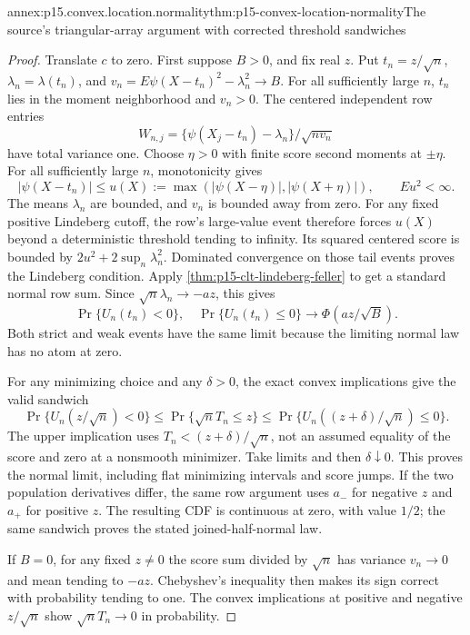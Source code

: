 \begin{annexitem}{annex:p15.convex.location.normality}{thm:p15-convex-location-normality}{The source's triangular-array argument with corrected threshold sandwiches}
\begin{proof}
Translate \(c\) to zero. First suppose \(B>0\), and fix real \(z\).
Put \(t_n=z/\sqrt n\),
\(\lambda_n=\lambda(t_n)\), and
\(v_n=E\psi(X-t_n)^2-\lambda_n^2\to B\).
For all sufficiently large \(n\), \(t_n\) lies in the moment
neighborhood and \(v_n>0\). The centered independent row entries
\[
 W_{n,j}=\{\psi(X_j-t_n)-\lambda_n\}/\sqrt{nv_n}
\]
have total variance one.
Choose \(\eta>0\) with finite score second moments at \(\pm\eta\).
For all sufficiently large \(n\), monotonicity gives
\[
 |\psi(X-t_n)|\leq
 u(X):=\max(|\psi(X-\eta)|,|\psi(X+\eta)|),\qquad Eu^2<\infty.
\]
The means \(\lambda_n\) are bounded, and \(v_n\) is bounded away
from zero. For any fixed positive Lindeberg cutoff, the row's
large-value event therefore forces \(u(X)\) beyond a deterministic
threshold tending to infinity. Its squared centered score is bounded
by \(2u^2+2\sup_n\lambda_n^2\).
Dominated convergence on those tail events proves the Lindeberg
condition. Apply \cref{thm:p15-clt-lindeberg-feller} to get a
standard normal row sum.
Since \(\sqrt n\lambda_n\to-az\), this gives
\[
 \Pr\{U_n(t_n)<0\},\quad\Pr\{U_n(t_n)\leq0\}
                   \longrightarrow\Phi(az/\sqrt B).
\]
Both strict and weak events have the same limit because the limiting
normal law has no atom at zero.

For any minimizing choice and any \(\delta>0\), the exact convex
implications give the valid sandwich
\[
 \Pr\{U_n(z/\sqrt n)<0\}
 \leq\Pr\{\sqrt n T_n\leq z\}
 \leq\Pr\{U_n((z+\delta)/\sqrt n)\leq0\}.
\]
The upper implication uses \(T_n<(z+\delta)/\sqrt n\), not an
assumed equality of the score and zero at a nonsmooth minimizer.
Take limits and then \(\delta\downarrow0\).
This proves the normal limit, including flat minimizing intervals
and score jumps.
If the two population derivatives differ, the same row argument
uses \(a_-\) for negative \(z\) and \(a_+\) for positive \(z\).
The resulting CDF is continuous at zero, with value \(1/2\);
the same sandwich proves the stated joined-half-normal law.

If \(B=0\), for any fixed \(z\ne0\) the score sum divided by
\(\sqrt n\) has variance \(v_n\to0\) and mean tending to \(-az\).
Chebyshev's inequality then makes its sign correct with probability
tending to one. The convex implications at positive and negative
\(z/\sqrt n\) show \(\sqrt nT_n\to0\) in probability.
\end{proof}
\end{annexitem}

